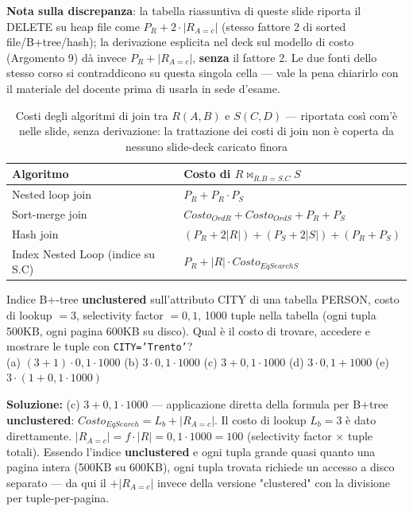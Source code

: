 \documentclass[12pt, a4paper]{article}
\begin{document}
\textbf{Nota sulla discrepanza}: la tabella riassuntiva di queste slide riporta il DELETE su heap file come $P_R + 2\cdot|R_{A=c}|$ (stesso fattore 2 di sorted file/B+tree/hash); la derivazione esplicita nel deck sul modello di costo (Argomento 9) dà invece $P_R + |R_{A=c}|$, \textbf{senza} il fattore 2. Le due fonti dello stesso corso si contraddicono su questa singola cella — vale la pena chiarirlo con il materiale del docente prima di usarla in sede d'esame.

\begin{table}[H]
\centering
\begin{tabular}{@{}ll@{}}
\toprule
\textbf{Algoritmo} & \textbf{Costo di $R \bowtie_{R.B=S.C} S$} \\
\midrule
Nested loop join & $P_R + P_R \cdot P_S$ \\
Sort-merge join & $Costo_{OrdR} + Costo_{OrdS} + P_R + P_S$ \\
Hash join & $(P_R+2|R|) + (P_S+2|S|) + (P_R+P_S)$ \\
Index Nested Loop (indice su S.C) & $P_R + |R|\cdot Costo_{EqSearchS}$ \\
\bottomrule
\end{tabular}
\caption{Costi degli algoritmi di join tra $R(A,B)$ e $S(C,D)$ — riportata così com'è nelle slide, senza derivazione: la trattazione dei costi di join non è coperta da nessuno slide-deck caricato finora}
\end{table}

\begin{tcolorbox}[colback=lightergray!10, colframe=tocsec, title=\textbf{Esercizio 1}]
Indice B+-tree \textbf{unclustered} sull'attributo CITY di una tabella PERSON, costo di lookup $=3$, selectivity factor $=0{,}1$, 1000 tuple nella tabella (ogni tupla 500KB, ogni pagina 600KB su disco). Qual è il costo di trovare, accedere e mostrare le tuple con \texttt{CITY='Trento'}? \\
(a) $(3+1)\cdot 0{,}1\cdot 1000$ \quad (b) $3\cdot 0{,}1\cdot 1000$ \quad (c) $3+0{,}1\cdot 1000$ \quad (d) $3\cdot 0{,}1+1000$ \quad (e) $3\cdot(1+0{,}1\cdot1000)$
\end{tcolorbox}
\textbf{Soluzione:} (c) $3+0{,}1\cdot 1000$ — applicazione diretta della formula per B+tree \textbf{unclustered}: $Costo_{EqSearch}=L_b+|R_{A=c}|$. Il costo di lookup $L_b=3$ è dato direttamente. $|R_{A=c}| = f\cdot|R| = 0{,}1\cdot 1000=100$ (selectivity factor $\times$ tuple totali). Essendo l'indice \textbf{unclustered} e ogni tupla grande quasi quanto una pagina intera (500KB su 600KB), ogni tupla trovata richiede un accesso a disco separato — da qui il $+|R_{A=c}|$ invece della versione "clustered" con la divisione per tuple-per-pagina.
\end{document}
